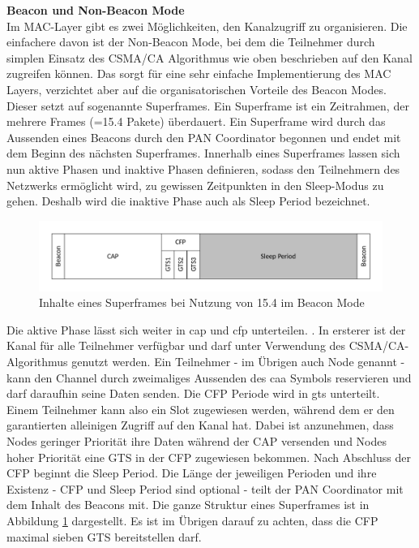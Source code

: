 \textbf{Beacon und Non-Beacon Mode}\\
Im MAC-Layer gibt es zwei Möglichkeiten, den Kanalzugriff zu organisieren. Die einfachere davon ist der Non-Beacon Mode, bei dem die Teilnehmer durch simplen Einsatz des CSMA/CA Algorithmus wie oben beschrieben auf den Kanal zugreifen können. Das sorgt für eine sehr einfache Implementierung des MAC Layers, verzichtet aber auf die organisatorischen Vorteile des Beacon Modes.\\
Dieser setzt auf sogenannte Superframes. Ein Superframe ist ein Zeitrahmen, der mehrere Frames (=15.4 Pakete) überdauert. Ein Superframe wird durch das Aussenden eines Beacons durch den PAN Coordinator begonnen und endet mit dem Beginn des nächsten Superframes. Innerhalb eines Superframes lassen sich nun aktive Phasen und inaktive Phasen definieren, sodass den Teilnehmern des Netzwerks ermöglicht wird, zu gewissen Zeitpunkten in den Sleep-Modus zu gehen. Deshalb wird die inaktive Phase auch als Sleep Period bezeichnet.\\
\begin{figure}
	\centering
	\includegraphics[width=\textwidth]{Grafiken-Alex/superframe.pdf}
	\caption{Inhalte eines Superframes bei Nutzung von 15.4 im Beacon Mode}
	\label{superframe}
\end{figure}
Die aktive Phase lässt sich weiter in \ac{cap} und \ac{cfp} unterteilen. \cite{superframestructure}. In ersterer ist der Kanal für alle Teilnehmer verfügbar und darf unter Verwendung des CSMA/CA-Algorithmus genutzt werden. Ein Teilnehmer - im Übrigen auch Node genannt - kann den Channel durch zweimaliges Aussenden des \ac{caa} Symbols reservieren und darf daraufhin seine Daten senden. \cite{sarodeslottedscmaca} Die CFP Periode wird in \ac{gts} unterteilt. Einem Teilnehmer kann also ein Slot zugewiesen werden, während dem er den garantierten alleinigen Zugriff auf den Kanal hat. Dabei ist anzunehmen, dass Nodes geringer Priorität ihre Daten während der CAP versenden und Nodes hoher Priorität eine GTS in der CFP zugewiesen bekommen. Nach Abschluss der CFP beginnt die Sleep Period. Die Länge der jeweiligen Perioden und ihre Existenz - CFP und Sleep Period sind optional - teilt der PAN Coordinator mit dem Inhalt des Beacons mit. Die ganze Struktur eines Superframes ist in Abbildung \ref{superframe} dargestellt. Es ist im Übrigen darauf zu achten, dass die CFP maximal sieben GTS bereitstellen darf.



